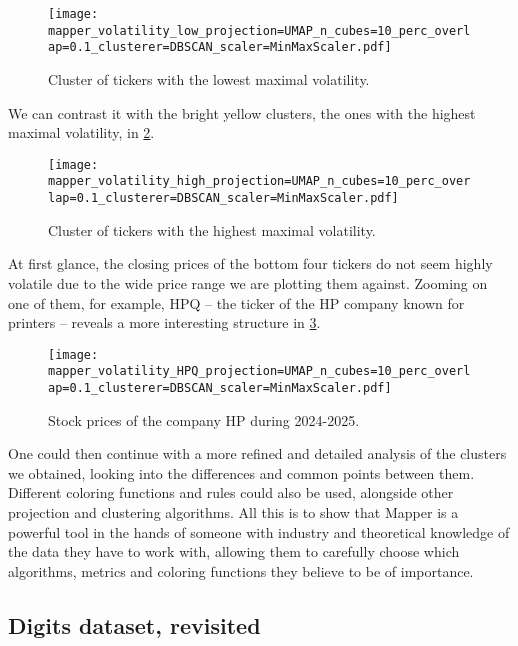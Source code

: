 \begin{figure}[h!]
  \centering
  \texttt{[image: mapper\_volatility\_low\_projection=UMAP\_n\_cubes=10\_perc\_overlap=0.1\_clusterer=DBSCAN\_scaler=MinMaxScaler.pdf]}
  \caption{Cluster of tickers with the lowest maximal volatility.}
  \label{fig:mapper_volatility_low}
\end{figure}

We can contrast it with the bright yellow clusters, the ones with the highest maximal volatility, in \ref{fig:mapper_volatility_high}.

\begin{figure}[h!]
  \centering
  \texttt{[image: mapper\_volatility\_high\_projection=UMAP\_n\_cubes=10\_perc\_overlap=0.1\_clusterer=DBSCAN\_scaler=MinMaxScaler.pdf]}
  \caption{Cluster of tickers with the highest maximal volatility.}
  \label{fig:mapper_volatility_high}
\end{figure}

At first glance, the closing prices of the bottom four tickers do not seem highly volatile due to the wide price range we are plotting them against. Zooming on one of them, for example, HPQ -- the ticker of the HP company known for printers -- reveals a more interesting structure in \ref{fig:mapper_volatility_hpq}.

\begin{figure}[h!]
  \centering
  \texttt{[image: mapper\_volatility\_HPQ\_projection=UMAP\_n\_cubes=10\_perc\_overlap=0.1\_clusterer=DBSCAN\_scaler=MinMaxScaler.pdf]}
  \caption{Stock prices of the company HP during 2024-2025.}
  \label{fig:mapper_volatility_hpq}
\end{figure}

One could then continue with a more refined and detailed analysis of the clusters we obtained, looking into the differences and common points between them. Different coloring functions and rules could also be used, alongside other projection and clustering algorithms. All this is to show that Mapper is a powerful tool in the hands of someone with industry and theoretical knowledge of the data they have to work with, allowing them to carefully choose which algorithms, metrics and coloring functions they believe to be of importance.

\subsection{Digits dataset, revisited}

